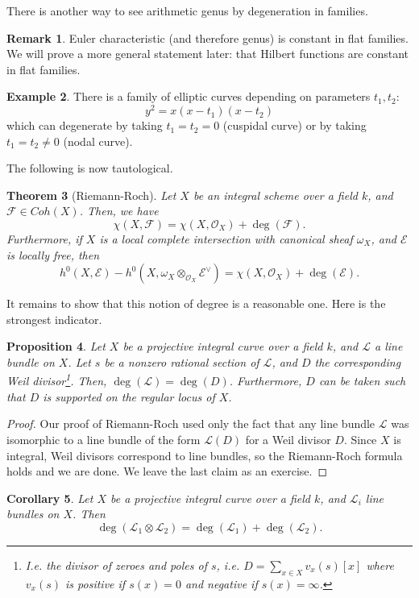 \documentclass[10pt]{article}
\newtheorem{thm}{Theorem}[section]
\newtheorem{prop}[thm]{Proposition}
\newtheorem{cor}[thm]{Corollary}
\theoremstyle{definition}
\newtheorem{exmp}[thm]{Example}
\newtheorem{rmk}[thm]{Remark}
\newcommand{\OO}{\mathcal{O}}
\newcommand{\LL}{\mathcal{L}}
\begin{document}
There is another way to see arithmetic genus by degeneration in families.  
\begin{rmk}
Euler characteristic (and therefore genus) is constant in flat families.  We will prove a more general statement later: that Hilbert functions are constant in flat families.
\end{rmk}

\begin{exmp}
There is a family of elliptic curves depending on parameters $t_1, t_2$:
$$y^2 = x(x-t_1)(x-t_2)$$
which can degenerate by taking $t_1 = t_2 = 0$ (cuspidal curve) or by taking $t_1 = t_2 \ne 0$ (nodal curve).
\end{exmp}




The following is now tautological.
\begin{thm}[Riemann-Roch]
Let $X$ be an integral scheme over a field $k$, and $\mathcal{F} \in Coh(X)$.  Then, we have
$$\chi(X, \mathcal{F}) = \chi(X, \OO_X) + \deg(\mathcal{F}).$$
Furthermore, if $X$ is a local complete intersection with canonical sheaf $\omega_X$, and $\mathcal{E}$ is locally free, then
$$h^0(X, \mathcal{E}) - h^0(X, \omega_X \otimes_{\OO_X} \mathcal{E}^\vee) = \chi(X, \OO_X) + \deg(\mathcal{E}).$$
\end{thm}



It remains to show that this notion of degree is a reasonable one.  Here is the strongest indicator.
\begin{prop}
Let $X$ be a projective integral curve over a field $k$, and $\LL$ a line bundle on $X$.  Let $s$ be a nonzero rational section of $\LL$, and $D$ the corresponding Weil divisor\footnote{I.e. the divisor of zeroes and poles of $s$, i.e. $D = \sum_{x \in X} v_x(s)[x]$ where $v_x(s)$ is positive if $s(x) = 0$ and negative if $s(x) = \infty$.}.  Then, $\deg(\LL) = \deg(D)$.  Furthermore, $D$ can be taken such that $D$ is supported on the regular locus of $X$.
\end{prop}
\begin{proof}
Our proof of Riemann-Roch used only the fact that any line bundle $\LL$ was isomorphic to a line bundle of the form $\LL(D)$ for a Weil divisor $D$.  Since $X$ is integral, Weil divisors correspond to line bundles, so the Riemann-Roch formula holds and we are done.  We leave the last claim as an exercise.
\end{proof}

\begin{cor}
Let $X$ be a projective integral curve over a field $k$, and $\mathcal{L}_i$ line bundles on $X$.  Then
$$\deg(\mathcal{L}_1 \otimes \mathcal{L}_2) = \deg(\mathcal{L}_1) + \deg(\mathcal{L}_2).$$
\end{cor}
\end{document}
